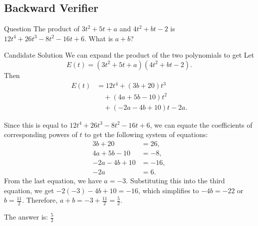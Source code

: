 \documentclass[11pt]{article}
\begin{document}
\subsection{Backward Verifier}

\begin{exbox}{Question}
The product of $3t^2+5t+a$ and $4t^2+bt-2$ is $12t^4+26t^3-8t^2-16t+6$. What is $a+b$?
\end{exbox}

\begin{exbox}{Candidate Solution}
We can expand the product of the two polynomials to get
Let
\[
E(t)=(3t^2+5t+a)(4t^2+bt-2).
\]
Then
\[
\begin{aligned}
E(t)
&= 12t^4 + (3b+20)t^3 \\
&\quad + (4a+5b-10)t^2 \\
&\quad + (-2a-4b+10)t - 2a.
\end{aligned}
\]

Since this is equal to $12t^4+26t^3-8t^2-16t+6$, we can equate the coefficients of corresponding powers of $t$ to get the following system of equations:
\begin{align*}
3b+20 &= 26, \\
4a+5b-10 &= -8, \\
-2a-4b+10 &= -16, \\
-2a &= 6.
\end{align*}
From the last equation, we have $a=-3$.
Substituting this into the third equation, we get $-2(-3)-4b+10=-16$, which simplifies to $-4b=-22$ or $b=\frac{11}{2}$.
Therefore, $a+b=-3+\frac{11}{2}=\boxed{\frac{5}{2}}$.

The answer is: $\frac{5}{2}$

\end{exbox}
\end{document}
